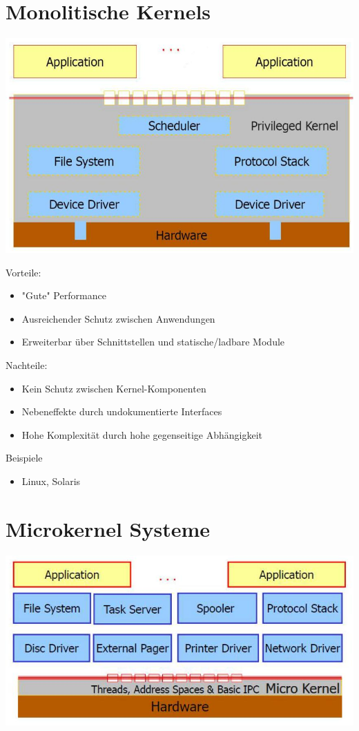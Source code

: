 \documentclass[a4paper]{scrreprt}
\begin{document}
\section{Monolitische Kernels}
	\begin{center}
		\includegraphics[scale=0.3]{graphics/monolithickernel.png}
	\end{center}
	Vorteile:
		\begin{itemize}
			\item "Gute" Performance
			\item Ausreichender Schutz zwischen Anwendungen
			\item Erweiterbar über Schnittstellen und statische/ladbare Module
		\end{itemize}
	Nachteile:
		\begin{itemize}
			\item Kein Schutz zwischen Kernel-Komponenten
			\item Nebeneffekte durch undokumentierte Interfaces
			\item Hohe Komplexität durch hohe gegenseitige Abhängigkeit
		\end{itemize}
	Beispiele
		\begin{itemize}
			\item Linux, Solaris
		\end{itemize}

\section{Microkernel Systeme}
	\begin{center}
		\includegraphics[scale=0.3]{graphics/microkernel.png}
	\end{center}
\end{document}
